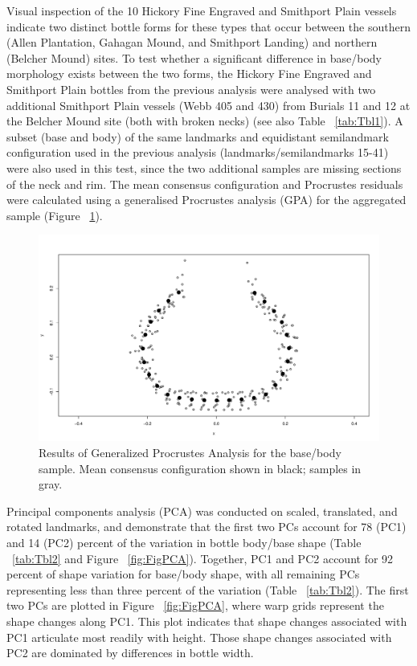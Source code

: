 \documentclass[review]{elsarticle}
\begin{document}
Visual inspection of the 10 Hickory Fine Engraved and Smithport Plain vessels indicate two distinct bottle forms for these types that occur between the southern (Allen Plantation, Gahagan Mound, and Smithport Landing) and northern (Belcher Mound) sites. To test whether a significant difference in base/body morphology exists between the two forms, the Hickory Fine Engraved and Smithport Plain bottles from the previous analysis were analysed with two additional Smithport Plain vessels (Webb 405 and 430) from Burials 11 and 12 at the Belcher Mound site (both with broken necks) (see also Table ~\ref{tab:Tbl1}). A subset (base and body) of the same landmarks and equidistant semilandmark configuration used in the previous analysis (landmarks/semilandmarks 15-41) were also used in this test, since the two additional samples are missing sections of the neck and rim. The mean consensus configuration and Procrustes residuals were calculated using a generalised Procrustes analysis (GPA) for the aggregated sample (Figure ~\ref{fig:FigGPAbba}). 

\begin{figure}[htbp]\centering
\includegraphics[width=\linewidth]{gpa-bba}
\caption{Results of Generalized Procrustes Analysis for the base/body sample. Mean consensus configuration shown in black; samples in gray.}
\label{fig:FigGPAbba}
\end{figure}

Principal components analysis (PCA) was conducted on scaled, translated, and rotated landmarks, and demonstrate that the first two PCs account for 78 (PC1) and 14 (PC2) percent of the variation in bottle body/base shape (Table ~\ref{tab:Tbl2} and Figure ~\ref{fig:FigPCA}). Together, PC1 and PC2 account for 92 percent of shape variation for base/body shape, with all remaining PCs representing less than three percent of the variation (Table ~\ref{tab:Tbl2}). The first two PCs are plotted in Figure ~\ref{fig:FigPCA}, where warp grids represent the shape changes along PC1. This plot indicates that shape changes associated with PC1 articulate most readily with height. Those shape changes associated with PC2 are dominated by differences in bottle width.
\end{document}
